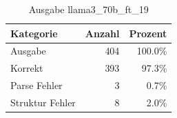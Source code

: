 
\begin{table}[!ht]
\centering
\begin{tabular}{lrr}
\toprule
\textbf{Kategorie} & \textbf{Anzahl} & \textbf{Prozent} \\
\midrule
Ausgabe & 404 & 100.0\% \\
Korrekt & 393 & 97.3\% \\
Parse Fehler & 3 & 0.7\% \\
Struktur Fehler & 8 & 2.0\% \\
\bottomrule
\end{tabular}
\caption{Ausgabe llama3_70b_ft_19}
\label{tab:file_counts}
\end{table}
    